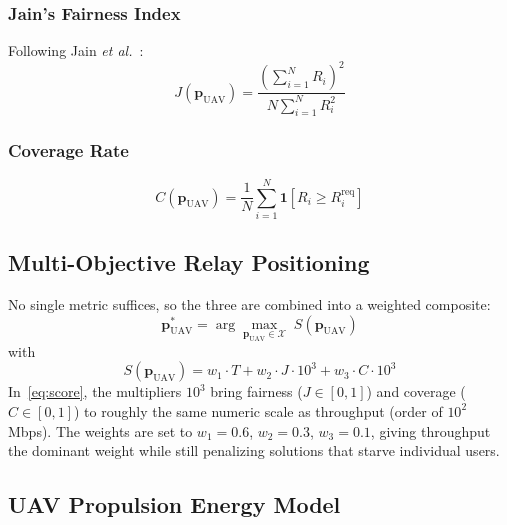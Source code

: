 \documentclass[journal]{IEEEtran}
\begin{document}
\subsubsection{Jain's Fairness Index}
Following Jain \textit{et al.}~\cite{jain1984}:
\begin{equation}
    J(\mathbf{p}_\text{UAV}) = \frac{\left(\sum_{i=1}^{N} R_i\right)^2}{N \sum_{i=1}^{N} R_i^2}
\end{equation}

\subsubsection{Coverage Rate}
\begin{equation}
    C(\mathbf{p}_\text{UAV}) = \frac{1}{N} \sum_{i=1}^{N} \mathbf{1}[R_i \geq R_i^\text{req}]
\end{equation}

\subsection{Multi-Objective Relay Positioning}

No single metric suffices, so the three are combined into a weighted composite:
\begin{equation}
    \mathbf{p}_\text{UAV}^* = \arg\max_{\mathbf{p}_\text{UAV} \in \mathcal{X}} \; S(\mathbf{p}_\text{UAV})
    \label{eq:objective}
\end{equation}
with
\begin{equation}
    S(\mathbf{p}_\text{UAV}) = w_1 \cdot T + w_2 \cdot J \cdot 10^3 + w_3 \cdot C \cdot 10^3
    \label{eq:score}
\end{equation}
In~\eqref{eq:score}, the multipliers $10^3$ bring fairness ($J \in [0,1]$) and coverage ($C \in [0,1]$) to roughly the same numeric scale as throughput (order of $10^2$\,Mbps). The weights are set to $w_1 = 0.6$, $w_2 = 0.3$, $w_3 = 0.1$, giving throughput the dominant weight while still penalizing solutions that starve individual users.

\subsection{UAV Propulsion Energy Model}
\end{document}
